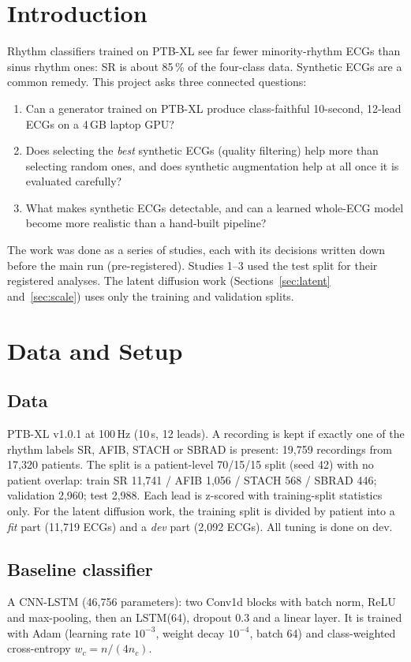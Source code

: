 \documentclass[11pt,a4paper]{article}
\begin{document}
\section{Introduction}
Rhythm classifiers trained on PTB-XL see far fewer minority-rhythm ECGs than sinus rhythm ones: SR is about 85\,\% of
the four-class data. Synthetic ECGs are a common remedy. This project asks three connected questions:
\begin{enumerate}
\item Can a generator trained on PTB-XL produce class-faithful 10-second, 12-lead ECGs on a 4\,GB laptop GPU?
\item Does selecting the \emph{best} synthetic ECGs (quality filtering) help more than selecting random ones, and does
  synthetic augmentation help at all once it is evaluated carefully?
\item What makes synthetic ECGs detectable, and can a learned whole-ECG model become more realistic than a
  hand-built pipeline?
\end{enumerate}
The work was done as a series of studies, each with its decisions written down before the main run (pre-registered).
Studies 1--3 used the test split for their registered analyses. The latent diffusion work (Sections~\ref{sec:latent}
and~\ref{sec:scale}) uses only the training and validation splits.

\section{Data and Setup}
\subsection{Data}
PTB-XL v1.0.1 at 100\,Hz (10\,s, 12 leads). A recording is kept if exactly one of the rhythm labels SR, AFIB, STACH
or SBRAD is present: 19,759 recordings from 17,320 patients. The split is a patient-level 70/15/15 split (seed 42)
with no patient overlap: train SR 11,741 / AFIB 1,056 / STACH 568 / SBRAD 446; validation 2,960; test 2,988. Each
lead is z-scored with training-split statistics only. For the latent diffusion work, the training split is divided by
patient into a \emph{fit} part (11,719 ECGs) and a \emph{dev} part (2,092 ECGs). All tuning is done on dev.

\subsection{Baseline classifier}
A CNN-LSTM (46,756 parameters): two Conv1d blocks with batch norm, ReLU and max-pooling, then an LSTM(64), dropout
0.3 and a linear layer. It is trained with Adam (learning rate $10^{-3}$, weight decay $10^{-4}$, batch 64) and
class-weighted cross-entropy $w_c = n/(4n_c)$.
\end{document}
